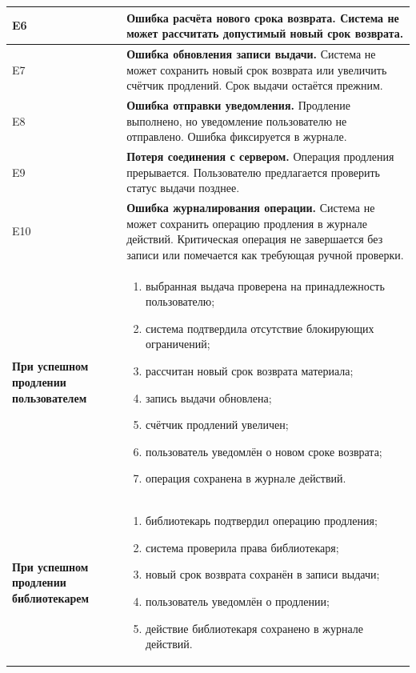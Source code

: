 \documentclass[12pt,a4paper]{article}
\begin{document}
\begin{xltabular}{\textwidth}{
				|>{\raggedright\arraybackslash}p{2.7cm}
				|>{\raggedright\arraybackslash}X|
			}
			E6 &
			\textbf{Ошибка расчёта нового срока возврата.}
			Система не может рассчитать допустимый новый срок возврата. \\
			\hline
			
			E7 &
			\textbf{Ошибка обновления записи выдачи.}
			Система не может сохранить новый срок возврата или увеличить счётчик
			продлений. Срок выдачи остаётся прежним. \\
			\hline
			
			E8 &
			\textbf{Ошибка отправки уведомления.}
			Продление выполнено, но уведомление пользователю не отправлено.
			Ошибка фиксируется в журнале. \\
			\hline
			
			E9 &
			\textbf{Потеря соединения с сервером.}
			Операция продления прерывается. Пользователю предлагается проверить
			статус выдачи позднее. \\
			\hline
			
			E10 &
			\textbf{Ошибка журналирования операции.}
			Система не может сохранить операцию продления в журнале действий.
			Критическая операция не завершается без записи или помечается как
			требующая ручной проверки. \\
			\hline
			
			
			\textbf{При успешном продлении пользователем} &
			\begin{enumerate}
				\item выбранная выдача проверена на принадлежность пользователю;
				\item система подтвердила отсутствие блокирующих ограничений;
				\item рассчитан новый срок возврата материала;
				\item запись выдачи обновлена;
				\item счётчик продлений увеличен;
				\item пользователь уведомлён о новом сроке возврата;
				\item операция сохранена в журнале действий.
			\end{enumerate} \\
			\hline
			
			\textbf{При успешном продлении библиотекарем} &
			\begin{enumerate}
				\item библиотекарь подтвердил операцию продления;
				\item система проверила права библиотекаря;
				\item новый срок возврата сохранён в записи выдачи;
				\item пользователь уведомлён о продлении;
				\item действие библиотекаря сохранено в журнале действий.
			\end{enumerate} \\
			\hline
			

\end{xltabular}
\end{document}
